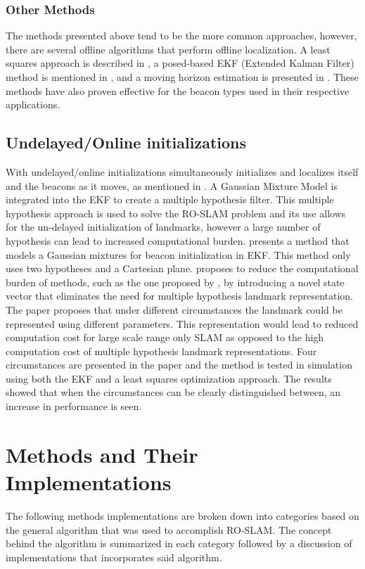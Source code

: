 \documentclass[conference]{IEEEtran}
\begin{document}
			\subsubsection{Other Methods}
			 	The methods presented above tend to be the more common approaches, however, there are several offline algorithms that perform offline localization. A least squares approach is described in \cite{Newman}, a posed-based EKF (Extended Kalman Filter) method is mentioned in \cite{Webster2012}, and a moving horizon estimation is presented in \cite{Vallicrosa2014a}. These methods have also proven effective for the beacon types used in their respective applications.
			

		\subsection{Undelayed/Online initializations}
			With undelayed/online initializations simultaneously initializes and localizes itself and the beacons as it moves, as mentioned in \cite{Caballero2010}. A Gaussian Mixture Model is integrated into the EKF to create a multiple hypothesis filter.  This multiple hypothesis approach is used to solve the RO-SLAM problem and its use allows for the un-delayed initialization of landmarks, however a large number of hypothesis can lead to increased computational burden. \cite{Geneve2015} presents a method that models a Gaussian mixtures for beacon initialization in EKF. This method only uses two hypotheses and a Cartesian plane. \cite{Ahmad2011a} proposes to reduce the computational burden of methods, such as the one proposed by \cite{Caballero2010}, by introducing a novel state vector that eliminates the need for multiple hypothesis landmark representation. The paper proposes that under different circumstances the landmark could be represented using different parameters. This representation would lead to reduced computation cost for large scale range only SLAM as opposed to the high computation cost of multiple hypothesis landmark representations. Four circumstances are presented in the paper and the method is tested in simulation using both the EKF and a least squares optimization approach. The results showed that when the circumstances can be clearly distinguished between, an increase in performance is seen.



	
	

	\section{Methods and Their Implementations}
	\label{methods and their implementations}
	The following methods implementations are broken down into categories based on the general algorithm that was used to accomplish RO-SLAM. The concept behind the algorithm is summarized in each category followed by a discussion of implementations that incorporates said algorithm. 
\end{document}
